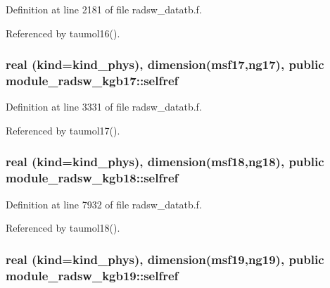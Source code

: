 Definition at line 2181 of file radsw\+\_\+datatb.\+f.



Referenced by taumol16().

\subsubsection[{\texorpdfstring{selfref}{selfref}}]{\setlength{\rightskip}{0pt plus 5cm}real (kind=kind\+\_\+phys), dimension(msf17,ng17), public module\+\_\+radsw\+\_\+kgb17\+::selfref}\hypertarget{group__module__radsw__main_gaade34dfbe8c5f380088b6e03acc727c9}{}\label{group__module__radsw__main_gaade34dfbe8c5f380088b6e03acc727c9}


Definition at line 3331 of file radsw\+\_\+datatb.\+f.



Referenced by taumol17().

\subsubsection[{\texorpdfstring{selfref}{selfref}}]{\setlength{\rightskip}{0pt plus 5cm}real (kind=kind\+\_\+phys), dimension(msf18,ng18), public module\+\_\+radsw\+\_\+kgb18\+::selfref}\hypertarget{group__module__radsw__main_ga488f807878d909b8f69457b0d7d8ac6a}{}\label{group__module__radsw__main_ga488f807878d909b8f69457b0d7d8ac6a}


Definition at line 7932 of file radsw\+\_\+datatb.\+f.



Referenced by taumol18().

\subsubsection[{\texorpdfstring{selfref}{selfref}}]{\setlength{\rightskip}{0pt plus 5cm}real (kind=kind\+\_\+phys), dimension(msf19,ng19), public module\+\_\+radsw\+\_\+kgb19\+::selfref}\hypertarget{group__module__radsw__main_gadb26cae00c05ac5c048a4db5a319a2eb}{}\label{group__module__radsw__main_gadb26cae00c05ac5c048a4db5a319a2eb}


